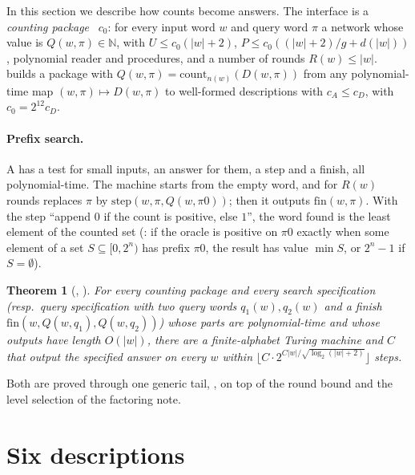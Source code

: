 \documentclass[10pt]{amsart}
\theoremstyle{plain}
\newtheorem{theorem}{Theorem}[section]
\theoremstyle{definition}
\theoremstyle{remark}
\numberwithin{equation}{section}
\newcommand{\N}{\mathbb{N}}
\begin{document}
In this section we describe how counts become answers. The interface is a \emph{counting package}
~$c_0$: for every input word $w$ and query word $\pi$ a network whose value is
$Q(w,\pi)\in\N$, with $U\le c_0(|w|+2)$, $P\le c_0((|w|+2)/g+d(|w|))$, polynomial reader and procedures,
and a number of rounds $R(w)\le|w|$.  builds a package with
$Q(w,\pi)=\mathrm{count}_{n(w)}(D(w,\pi))$ from any polynomial-time map $(w,\pi)\mapsto D(w,\pi)$ to
well-formed descriptions with $c_A\le c_D$, with $c_0=2^{12}c_D$.

\paragraph{Prefix search.} A  has a test for small inputs, an answer for them, a step
and a finish, all polynomial-time. The machine  starts from the empty word, and for
$R(w)$ rounds replaces $\pi$ by $\mathrm{step}(w,\pi,Q(w,\pi0))$; then it outputs $\mathrm{fin}(w,\pi)$.
With the step ``append $0$ if the count is positive, else $1$'', the word found is the least element of
the counted set (: if the oracle is positive on $\pi0$ exactly when some element of a
set $S\subseteq[0,2^n)$ has prefix $\pi0$, the result has value $\min S$, or $2^n-1$ if $S=\emptyset$).

\begin{theorem}[, ]\label{thm:machines}
For every counting package and every search specification (resp.\ query specification with two query words
$q_1(w),q_2(w)$ and a finish $\mathrm{fin}(w,Q(w,q_1),Q(w,q_2))$) whose parts are polynomial-time and whose
outputs have length $O(|w|)$, there are a finite-alphabet Turing machine and $C$ that output the specified
answer on every $w$ within $\lfloor C\cdot2^{C|w|/\sqrt{\log_2(|w|+2)}}\rfloor$ steps.
\end{theorem}

\noindent Both are proved through one generic tail, , on top of the round bound
 and the level selection of the factoring note.

\section{Six descriptions}\label{sec:instances}
\end{document}
